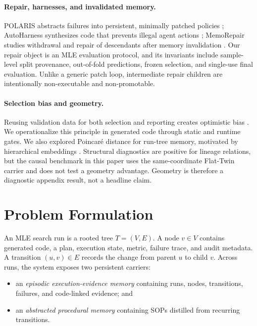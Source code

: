 \documentclass{article}
\begin{document}
\paragraph{Repair, harnesses, and invalidated memory.}
POLARIS abstracts failures into persistent, minimally patched policies
\citep{kakade2026polaris}; AutoHarness synthesizes code that prevents illegal
agent actions \citep{lou2026autoharness}; MemoRepair studies withdrawal and
repair of descendants after memory invalidation \citep{zhao2026memorepair}.
Our repair object is an MLE evaluation protocol, and its invariants include
sample-level split provenance, out-of-fold predictions, frozen selection, and
single-use final evaluation.  Unlike a generic patch loop, intermediate repair
children are intentionally non-executable and non-promotable.

\paragraph{Selection bias and geometry.}
Reusing validation data for both selection and reporting creates optimistic
bias \citep{varma2006bias,cawley2010overfitting}.  We operationalize this
principle in generated code through static and runtime gates.  We also explored
Poincar\'e distance for run-tree memory, motivated by hierarchical embeddings
\citep{nickel2017poincare}.  Structural diagnostics are positive for lineage
relations, but the causal benchmark in this paper uses the same-coordinate
Flat-Twin carrier and does not test a geometry advantage.  Geometry is therefore
a diagnostic appendix result, not a headline claim.

\section{Problem Formulation}

An MLE search run is a rooted tree $T=(V,E)$.  A node $v\in V$ contains generated
code, a plan, execution state, metric, failure trace, and audit metadata.  A
transition $(u,v)\in E$ records the change from parent $u$ to child $v$.  Across
runs, the system exposes two persistent carriers:

\begin{itemize}[leftmargin=*,itemsep=1pt]
  \item an \emph{episodic execution-evidence memory} containing runs, nodes,
  transitions, failures, and code-linked evidence; and
  \item an \emph{abstracted procedural memory} containing SOPs distilled from
  recurring transitions.
\end{itemize}
\end{document}
